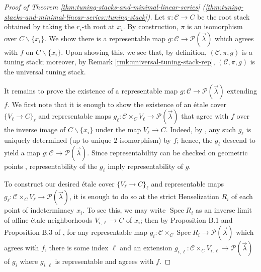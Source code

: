 \documentclass[a4paper,12pt]{amsart}
\theoremstyle{definition}
\newcommand{\cC}{\mathcal{C}}
\newcommand{\Pcv}{\mathcal{P}(\vec{\lambda})}
\DeclareMathOperator{\Spec}{Spec}
\renewcommand{\setminus}{\smallsetminus}
\begin{document}
	
	\begin{proof}[{Proof of Theorem \ref{thm:tuning-stacks-and-minimal-linear-series} (\ref{thm:tuning-stacks-and-minimal-linear-series::tuning-stack})}]
		Let $\pi\colon\cC\to C$ be the root stack obtained by taking the $r_i$-th root at $x_i$. By construction, $\pi$ is an isomorphism over $C\setminus\{x_i\}$. We show there is a representable map $g\colon\cC\to\Pcv$ which agrees with $f$ on $C\setminus\{x_i\}$. Upon showing this, we see that, by definition, $(\cC,\pi,g)$ is a tuning stack; moreover, by Remark \ref{rmk:universal-tuning-stack-rep}, $(\cC,\pi,g)$ is the universal tuning stack.
		
		It remains to prove the existence of a representable map $g\colon\cC\to\Pcv$ extending $f$. We first note that it is enough to show the existence of an \'etale cover $\{V_\ell\to C\}_\ell$ and representable maps $g_\ell\colon\cC\times_C V_\ell\to\Pcv$ that agree with $f$ over the inverse image of $C\setminus\{x_i\}$ under the map $V_\ell\to C$. Indeed, by \cite[Prop. 1.2]{FMN}, any such $g_\ell$ is uniquely determined (up to unique $2$-isomorphism) by $f$; hence, the $g_\ell$ descend to yield a map $g\colon\cC\to\Pcv$. Since representability can be checked on geometric points \cite[Cor. 2.2.7]{Conrad}, representability of the $g_\ell$ imply representability of $g$.
		
		To construct our desired \'etale cover $\{V_\ell\to C\}_\ell$ and representable maps $g_\ell\colon\cC\times_C V_\ell\to\Pcv$, it is enough to do so at the strict Henselization $R_i$ of each point of indeterminacy $x_i$. To see this, we may write $\Spec R_i$ as an inverse limit of affine \'etale neighborhoods $V_{i,\ell}\to C$ of $x_i$; then by Proposition B.1 and Proposition B.3 of \cite{rydh}, for any representable map $g_i\colon\cC\times_C\Spec R_i\to\Pcv$ which agrees with $f$, there is some index $\ell$ and an extension $g_{i,\ell}\colon\cC\times_C V_{i,\ell}\to\Pcv$ of $g_i$ where $g_{i,\ell}$ is representable and agrees with $f$.
		

\end{proof}
\end{document}
